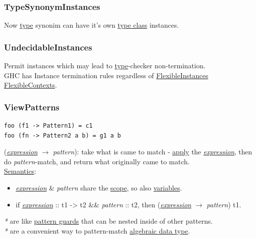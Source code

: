 \documentclass[a4paper,14pt,oneside]{book}
\begin{document}
\subsubsection{\label{orgf64bc38}TypeSynonymInstances}
\label{sec:org8f1b633}
Now \hyperref[orgd6db20c]{type} synonim can have it's own \hyperref[org904b85b]{type class} instances.\\

\subsubsection{\label{orga17b59e}UndecidableInstances}
\label{sec:org8a73b80}
Permit instances which may lead to \hyperref[orgd6db20c]{type}-checker non-termination.\\

GHC has Instance termination rules regardless of \hyperref[orgfc8f94e]{FlexibleInstances} \hyperref[orgfaf00d3]{FlexibleContexts}.\\

\subsubsection{\label{org8a63159}ViewPatterns}
\label{sec:org61a8bb0}
\begin{verbatim}
foo (f1 -> Pattern1) = c1
foo (fn -> Pattern2 a b) = g1 a b
\end{verbatim}
(\emph{\hyperref[org6aa6989]{expression}} \(\to\) \emph{pattern}): take what is came to match - \hyperref[orgc6b1d81]{apply} the \emph{\hyperref[org6aa6989]{expression}}, then do \emph{pattern}-match, and return what originally came to match.\\

\hyperref[org322a4b8]{Semantics}:\\
\begin{itemize}
\item \emph{\hyperref[org6aa6989]{expression}} \& \emph{pattern} share the \hyperref[orgb5173ee]{scope}, so also \hyperref[org8831698]{variables}.\\
\item{if \emph{\hyperref[org6aa6989]{expression}} :: t1 -> t2 \&\& \emph{pattern} :: t2, then (\emph{\hyperref[org6aa6989]{expression}} \(\to\) \emph{pattern})} t1.\\
\end{itemize}

\emph{*} are like \hyperref[orgbfa44d0]{pattern guards} that can be nested inside of other patterns.\\
\emph{*} are a convenient way to pattern-match \hyperref[org05a048b]{algebraic data type}.\\
\end{document}
